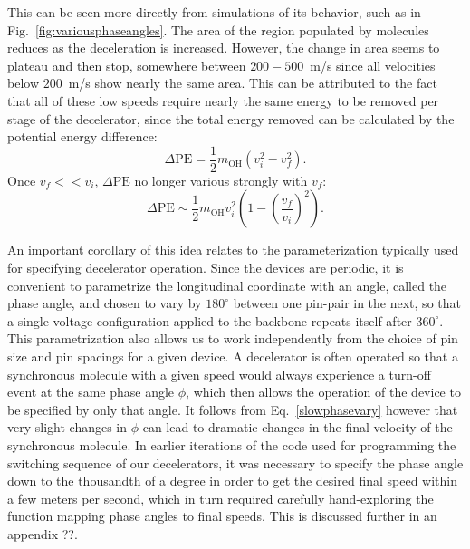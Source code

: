 This can be seen more directly from simulations of its behavior, such as in Fig.~\ref{fig:variousphaseangles}. The area of the region populated by molecules reduces as the deceleration is increased.
However, the change in area seems to plateau and then stop, somewhere between $200-500$~m/s since all velocities below $200$~m/s show nearly the same area.
This can be attributed to the fact that all of these low speeds require nearly the same energy to be removed per stage of the decelerator, since the total energy removed can be calculated by the potential energy difference:
\begin{equation}
\Delta\text{PE}=\frac{1}{2}m_\text{OH}\left(v_i^2-v_f^2\right).
\end{equation}
Once $v_f << v_i$, $\Delta\text{PE}$ no longer various strongly with $v_f$:
\begin{equation}
\label{slowphasevary}
\Delta\text{PE}\sim\frac{1}{2}m_\text{OH}v_i^2\left(1-\left(\frac{v_f}{v_i}\right)^2\right).
\end{equation}

An important corollary of this idea relates to the parameterization typically used for specifying decelerator operation.
Since the devices are periodic, it is convenient to parametrize the longitudinal coordinate with an angle, called the phase angle, and chosen to vary by $180^\circ$ between one pin-pair in the next, so that a single voltage configuration applied to the backbone repeats itself after $360^\circ$.
This parametrization also allows us to work independently from the choice of pin size and pin spacings for a given device.
A decelerator is often operated so that a synchronous molecule with a given speed would always experience a turn-off event at the same phase angle $\phi$, which then allows the operation of the device to be specified by only that angle.
It follows from Eq.~\ref{slowphasevary} however that very slight changes in $\phi$ can lead to dramatic changes in the final velocity of the synchronous molecule.
In earlier iterations of the code used for programming the switching sequence of our decelerators, it was necessary to specify the phase angle down to the thousandth of a degree in order to get the desired final speed within a few meters per second, which in turn required carefully hand-exploring the function mapping phase angles to final speeds.
This is discussed further in an appendix ??.

